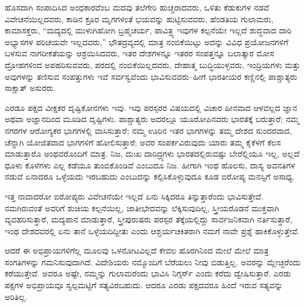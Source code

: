 \vskip 4pt

ಹೊಸದಾಗಿ ಸಂಪಾದಿಸಿದ ಅಂಧಕಾರವೆಂಬ ಮದವು ತಲೆಗೇರಿ ಹುಚ್ಚರಾದವರು, ಒಳಿತು ಕೆಡುಕುಗಳ ನಡವೆ ವಿವೇಚನೆಯಿಲ್ಲದವರು, ಕಾಡಿನ ಕ್ರೂರ ಮೃಗಗಳಂತೆ ಭಯವನ್ನು ಹುಟ್ಟಿಸುವವರು, ಹೆಂಡತಿಯ ಗುಲಾಮರು, ಕಾಮಾಸಕ್ತರು, “ಮದ್ಯದಲ್ಲಿ ಮುಳುಗಿಹೋಗಿ ಬ್ರಹ್ಮಚರ್ಯ, ಪಾವಿತ್ರ್ಯ ಇವುಗಳ ಕಲ್ಪನೆಯೇ ಇಲ್ಲದೆ ಶುದ್ಧವಾದ ದಾರಿ ಅಭ್ಯಾಸಗಳ ಪರಿಚಯವೇ ಇಲ್ಲದವರು,” ಭೌತದ್ರವ್ಯದಲ್ಲಿ ಮಾತ್ರ ನಂಬಿಕೆಯಿಟ್ಟು ಅದನ್ನು ವಿವಿಧ ಪ್ರಯೋಜನಗಳಿಗೆ ಬಳಸುವ ನಾಗರೀಕತೆಯನ್ನು ಆಶ್ರಯಿಸಿದವರು, ಇತರ ದೇಶಗಳನ್ನೂ ಇತರರ ಸಂಪತ್ತನ್ನೂ ಬಲಾತ್ಕಾರ ಮೋಸ ದ್ರೋಹಗಳಿಂದ ಅಪಹರಿಸುವವರು, ಪರದಲ್ಲಿ ನಂಬಿಕೆಯಿಲ್ಲದವರು, ದೇಹಾತ್ಮ ಬುದ್ಧಿಯುಳ್ಳವರು, ಇಂದ್ರಿಯಗಳು ಮತ್ತು ಅವುಗಳನ್ನು ತಣಿಸುವ ಸಂಪತ್ತುಗಳು ಇವೆ ಸರ್ವಸ್ವವೆಂದು ಭಾವಿಸುವವರು–ಹೀಗೆ ಭಾರತೀಯರ ಕಣ್ಣಿನಲ್ಲಿ ಪಾಶ್ಚಾತ್ಯರು ಸಾಕ್ಷಾತ್​ ಅಸುರರು.

\vskip 4pt

ಎರಡೂ ಪಕ್ಷದ ವೀಕ್ಷಕರ ದೃಷ್ಟಿಕೋನಗಳು ಇವು. ಇವು ಪರಸ್ಪರರ ವಿಷಯದಲ್ಲಿ ವಿಚಾರ ಹೀನವಾದ ಆಳವಲ್ಲದ ಜ್ಞಾನ ಅಥವಾ ಅಜ್ಞಾನದಿಂದ ಮೂಡಿದ ದೃಷ್ಟಿಗಳು. ಪಾಶ್ಚಾತ್ಯರು ಅದರಲ್ಲೂ ಯೂರೋಪಿನವರು ಭಾರತಕ್ಕೆ ಬರುತ್ತಾರೆ; ನಮ್ಮ ನಗರಗಳ ಆರೋಗ್ಯಕರ ಭಾಗಗಳಲ್ಲಿ ವಾಸಿಸುತ್ತಾರೆ; ನಮ್ಮ ಊರಿನ ಇತರ ಭಾಗಗಳನ್ನು ತಮ್ಮ ದೇಶದ ಸುಂದರವಾದ, ಚೆನ್ನಾಗಿ ಯೋಜಿತವಾದ ಭಾಗಗಳಿಗೆ ಹೋಲಿಸುತ್ತಾರೆ; ಅವರ ಸಂಪರ್ಕವಿರುವುದು ಯಾರು ತಮ್ಮ ಕೈಕೆಳಗೆ ಕೆಲಸ ಮಾಡುತ್ತಾರೊ ಅಂಥವರೊಂದಿಗೆ ಮಾತ್ರ. ನಿಜ, ದುಃಖ ದಾರಿದ್ರ್ಯಗಳು ಭಾರತದಲ್ಲಿರುವಷ್ಟು ಬೇರೆಲ್ಲಿಯೂ ಇಲ್ಲ, ಅಲ್ಲದೆ ಧೂಳು ಕೊಳೆಗಳು ಎಲ್ಲ ಕಡೆಯೂ ತುಂಬಿಕೊಂಡಿವೆ ಎಂಬುದೂ ನಿಜ. ಹೀಗಾಗಿ ಇಂಥ ಹೊಲಸು, ದಾಸ್ಯ ಅವನತಿಗಳ ನಡುವೆ ಏನಾದರೂ ಒಳ್ಳೆಯದು ಇರಬಹುದು ಎಂಬುದನ್ನು ಕಲ್ಪಿಸಿಕೊಳ್ಳುವುದೂ ಕೂಡ ಐರೋಪ್ಯ ಮನಸ್ಸಿಗೆ ಅಸಾಧ್ಯ.

ಇತ್ತ ನಾವಾದರೋ ಐರೋಪ್ಯರು ವಿವೇಚನೆಯೇ ಇಲ್ಲದೆ ಏನು ಸಿಕ್ಕಿದರೂ ತಿನ್ನುತ್ತಾರೆಂದು ಭಾವಿಸುತ್ತೇವೆ. ನಮಗಿರುವಂತೆ ಅವರಿಗೆ ಶುಚಿಯ ಕಲ್ಪನೆಯಿಲ್ಲ, ಜಾತೀಭೇದವನ್ನು ಲೆಕ್ಕಿಸುವುದಿಲ್ಲ, ಸ್ತ್ರೀಯರೊಡನೆ ಮುಕ್ತವಾಗಿ ವ್ಯವಹರಿಸುತ್ತಾರೆ, ಮದ್ಯಪಾನ ಮಾಡುತ್ತಾರೆ, ಸ್ತ್ರೀಪುರುಷರು ಪರಸ್ಪರ ತೆಕ್ಕೆಯಲ್ಲಿದ್ದು ಸಾರ್ವಜನಿಕವಾಗಿ ನರ್ತಿಸುತ್ತಾರೆ, ಇಂಥ ದೇಶದವರಲ್ಲಿ ಏನು ತಾನೆ ಒಳ್ಳೆಯದಿದ್ದೀತು ಎಂದು ಆಶ್ಚರ್ಯಚಕಿತರಾಗಿ ನಮಗೆ ನಾವೇ ಪ್ರಶ್ನೆ ಹಾಕಿಕೊಳ್ಳುತ್ತೇವೆ.
\vskip 4pt

ಆದರೆ ಈ ಅಭಿಪ್ರಾಯಗಳಿಗೆಲ್ಲ ಮೂಲವು ಒಳನೋಟವಿಲ್ಲದೆ ಕೇವಲ ಹೊರಗಿನಿಂದ ಮೇಲೆ ಮೇಲೆ ಮಾತ್ರ ಸಂಗತಿಗಳನ್ನು ಗಮನಿಸುವುದಾಗಿದೆ. ವಿದೇಶಿಯರು ನಮ್ಮೊಂದಿಗೆ ಬೆರೆಯಲು ನೀವು ಬಿಡುತ್ತಿಲ್ಲ. ಅವರನ್ನು ಮ್ಲೇಚ್ಛರೆಂದು ಕರೆಯುತ್ತೇವೆ. ಅವರೂ ಅಷ್ಟೇ, ನಮ್ಮನ್ನು ಗುಲಾಮರೆಂದು ಭಾವಿಸಿ ನಿಗ್ಗರ್ಸ್​ ಎಂದು ಕರೆದು ದ್ವೇಷಿಸುತ್ತಾರೆ. ಎರಡು ಪಕ್ಷಗಳ ಅಭಿಪ್ರಾಯವೂ ಸ್ವಲ್ಪಮಟ್ಟಿಗೆ ಸತ್ಯವಿರಬಹುದು. ಆದರೂ ಎರಡು ಪಕ್ಷದವರೂ ಹಿಂದೆ ಇರುವ ಸತ್ಯವನ್ನು ಅರಿತಿಲ್ಲ.

\vskip 4pt

